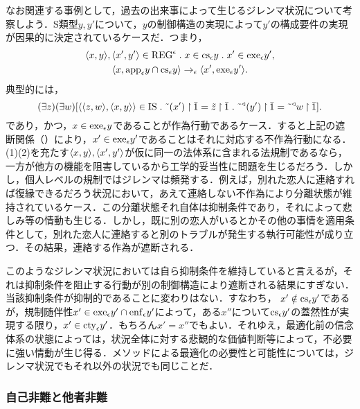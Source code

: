 なお関連する事例として，過去の出来事によって生じるジレンマ状況について考察しよう．S類型$ y,y' $について，$y$の制御構造の実現によって$y'$の構成要件の実現が因果的に決定されているケースだ．つまり，
\setcounter{equation}{0}
\begin{gather}
    \orp{x,y},\orp{x',y'}\in\mathrm{REG}^\epsilon\con{1}x\in\cs{\epsilon}y\con{1}x'\in \exe{\epsilon}y',\\
    \orp{x,\app{\epsilon}y\cap\cs{\epsilon}y}\to_{\epsilon}\orp{x',\exe{\epsilon}y'}.
\end{gather}
典型的には，
\[
    (\exists z)(\exists w)[
        \orp{\orp{z,w},\orp{x,y}}\in\mathrm{IS}\con{1}
        \tildel{(x')}\uphr\bar{1}=\tilde{z}\uphr\bar{1}\con{1}\tildel{\trgl{(y')}}\uphr\bar{1}=\tildel{\trgl{w}}\uphr\bar{1}
    ].
\]
であり，かつ，$ x\in \mathrm{exe}_{\epsilon}y $であることが作為行動であるケース．すると上記の遮断関係（）により，$ x'\in \mathrm{exe}_{\epsilon}y' $であることはそれに対応する不作為行動になる．
(1)(2)を充たす$ \langle x,y \rangle,\langle x',y' \rangle $が仮に同一の法体系に含まれる法規制であるなら，一方が他方の機能を阻害しているから工学的妥当性に問題を生じるだろう．しかし，個人レベルの規制ではジレンマは頻発する．例えば，別れた恋人に連絡すれば復縁できるだろう状況において，あえて連絡しない不作為により分離状態が維持されているケース．この分離状態それ自体は抑制条件であり，それによって悲しみ等の情動も生じる．しかし，既に別の恋人がいるとかその他の事情を適用条件として，別れた恋人に連絡すると別のトラブルが発生する執行可能性が成り立つ．その結果，連絡する作為が遮断される．

このようなジレンマ状況においては自ら抑制条件を維持していると言えるが，それは抑制条件を阻止する行動が別の制御構造により遮断される結果にすぎない．当該抑制条件が抑制的であることに変わりはない．すなわち，
$ x'\notin\mathrm{cs}_{\epsilon}y' $であるが，規制随伴性$ x'\in\mathrm{exe}_{\epsilon}y'\cap\mathrm{enf}_{\epsilon}y' $によって，ある$ x'' $について$ \mathrm{cs}_{\epsilon}y' $の蓋然性が実現する限り，$ x'\in\mathrm{cty}_{\epsilon}y' $．もちろん$ x' = x'' $でもよい．それゆえ，最適化前の信念体系の状態によっては，状況全体に対する悲観的な価値判断等によって，不必要に強い情動が生じ得る．メソッドによる最適化の必要性と可能性については，ジレンマ状況でもそれ以外の状況でも同じことだ．

\subsubsection{自己非難と他者非難}
\label{sssec:自己非難と他者非難}

